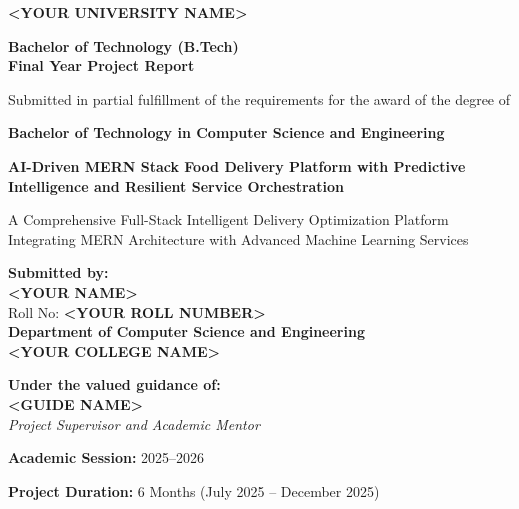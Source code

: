 \documentclass[12pt,a4paper]{report}
\newcommand{\ProjectTitle}{AI-Driven MERN Stack Food Delivery Platform with Predictive Intelligence and Resilient Service Orchestration}
\newcommand{\StudentName}{<YOUR NAME>}
\newcommand{\RollNo}{<YOUR ROLL NUMBER>}
\newcommand{\DepartmentName}{Department of Computer Science and Engineering}
\newcommand{\CollegeName}{<YOUR COLLEGE NAME>}
\newcommand{\UniversityName}{<YOUR UNIVERSITY NAME>}
\newcommand{\GuideName}{<GUIDE NAME>}
\newcommand{\AcademicYear}{2025--2026}
\begin{document}
\begin{titlepage}
    \centering
    \vspace*{1.5cm}
    {\Large \textbf{\UniversityName} \par}
    \vspace{1.2cm}
    {\large \textbf{Bachelor of Technology (B.Tech) \\ Final Year Project Report} \par}
    \vspace{0.8cm}
    {\large Submitted in partial fulfillment of the requirements for the award of the degree of \par}
    {\large \textbf{Bachelor of Technology in Computer Science and Engineering} \par}
    \vspace{1.8cm}
    {\Huge \textbf{\ProjectTitle} \par}
    \vspace{2cm}
    {\Large A Comprehensive Full-Stack Intelligent Delivery Optimization Platform \\ Integrating MERN Architecture with Advanced Machine Learning Services \par}
    \vspace{2cm}
    \begin{flushleft}
        \textbf{Submitted by:} \\
        \textbf{\StudentName} \\
        Roll No: \textbf{\RollNo} \\
        \vspace{0.5cm}
        \textbf{\DepartmentName} \\
        \textbf{\CollegeName}
    \end{flushleft}
    \vspace{1.5cm}
    \begin{flushleft}
        \textbf{Under the valued guidance of:} \\
        \textbf{\GuideName} \\
        \textit{Project Supervisor and Academic Mentor}
    \end{flushleft}
    \vfill
    {\large \textbf{Academic Session:} \AcademicYear \par}
    {\large \textbf{Project Duration:} 6 Months (July 2025 -- December 2025) \par}
\end{titlepage}

\end{document}
